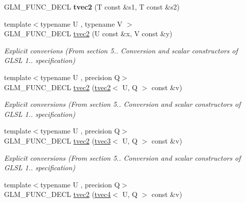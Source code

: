 \begin{DoxyCompactItemize}
\item 
\hypertarget{structglm_1_1detail_1_1tvec2_a1c01dd00c55f77aae7bbb7e33ca85c54}{G\-L\-M\-\_\-\-F\-U\-N\-C\-\_\-\-D\-E\-C\-L {\bfseries tvec2} (T const \&s1, T const \&s2)}\label{structglm_1_1detail_1_1tvec2_a1c01dd00c55f77aae7bbb7e33ca85c54}

\item 
\hypertarget{structglm_1_1detail_1_1tvec2_a7521b4e5e4260e7e53f936b01b18e3c7}{{\footnotesize template$<$typename U , typename V $>$ }\\G\-L\-M\-\_\-\-F\-U\-N\-C\-\_\-\-D\-E\-C\-L \hyperlink{structglm_1_1detail_1_1tvec2_a7521b4e5e4260e7e53f936b01b18e3c7}{tvec2} (U const \&x, V const \&y)}\label{structglm_1_1detail_1_1tvec2_a7521b4e5e4260e7e53f936b01b18e3c7}

\begin{DoxyCompactList}\small\item\em Explicit converions (From section 5.. Conversion and scalar constructors of G\-L\-S\-L 1.. specification) \end{DoxyCompactList}\item 
\hypertarget{structglm_1_1detail_1_1tvec2_aac611127f03f3948bacb14b063fa3aca}{{\footnotesize template$<$typename U , precision Q$>$ }\\G\-L\-M\-\_\-\-F\-U\-N\-C\-\_\-\-D\-E\-C\-L \hyperlink{structglm_1_1detail_1_1tvec2_aac611127f03f3948bacb14b063fa3aca}{tvec2} (\hyperlink{structglm_1_1detail_1_1tvec2}{tvec2}$<$ U, Q $>$ const \&v)}\label{structglm_1_1detail_1_1tvec2_aac611127f03f3948bacb14b063fa3aca}

\begin{DoxyCompactList}\small\item\em Explicit conversions (From section 5.. Conversion and scalar constructors of G\-L\-S\-L 1.. specification) \end{DoxyCompactList}\item 
\hypertarget{structglm_1_1detail_1_1tvec2_a79d0d9907539559a9c5cea20a57ad669}{{\footnotesize template$<$typename U , precision Q$>$ }\\G\-L\-M\-\_\-\-F\-U\-N\-C\-\_\-\-D\-E\-C\-L \hyperlink{structglm_1_1detail_1_1tvec2_a79d0d9907539559a9c5cea20a57ad669}{tvec2} (\hyperlink{structglm_1_1detail_1_1tvec3}{tvec3}$<$ U, Q $>$ const \&v)}\label{structglm_1_1detail_1_1tvec2_a79d0d9907539559a9c5cea20a57ad669}

\begin{DoxyCompactList}\small\item\em Explicit conversions (From section 5.. Conversion and scalar constructors of G\-L\-S\-L 1.. specification) \end{DoxyCompactList}\item 
\hypertarget{structglm_1_1detail_1_1tvec2_a5a2a0de134fd7f21ba208978968611b8}{{\footnotesize template$<$typename U , precision Q$>$ }\\G\-L\-M\-\_\-\-F\-U\-N\-C\-\_\-\-D\-E\-C\-L \hyperlink{structglm_1_1detail_1_1tvec2_a5a2a0de134fd7f21ba208978968611b8}{tvec2} (\hyperlink{structglm_1_1detail_1_1tvec4}{tvec4}$<$ U, Q $>$ const \&v)}\label{structglm_1_1detail_1_1tvec2_a5a2a0de134fd7f21ba208978968611b8}


\end{DoxyCompactItemize}
